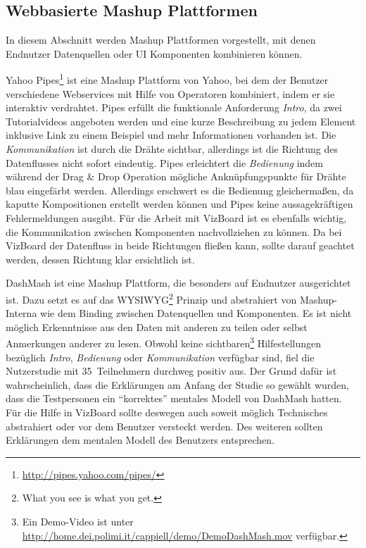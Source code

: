 \documentclass[
	headsepline,
	footsepline,
	fontsize=12pt,
	bibliography=totoc
]{scrbook}
\begin{document}
\subsection{Webbasierte Mashup Plattformen}
\label{section:standderforschung:verwandte_arbeiten:mashups}

In diesem Abschnitt werden Mashup Plattformen vorgestellt, mit denen Endnutzer Datenquellen oder UI Komponenten kombinieren können.


Yahoo Pipes\footnote{\url{http://pipes.yahoo.com/pipes/}} ist eine Mashup Plattform von Yahoo, bei dem der Benutzer verschiedene Webservices mit Hilfe von Operatoren kombiniert, indem er sie interaktiv verdrahtet.
Pipes erfüllt die funktionale Anforderung \emph{Intro}, da zwei Tutorialvideos angeboten werden und eine kurze Beschreibung zu jedem Element inklusive Link zu einem Beispiel und mehr Informationen vorhanden ist. Die \emph{Kommunikation} ist durch die Drähte sichtbar, allerdings ist die Richtung des Datenflusses nicht sofort eindeutig. Pipes erleichtert die \emph{Bedienung} indem während der Drag \& Drop Operation mögliche Anknüpfungspunkte für Drähte blau eingefärbt werden.
Allerdings erschwert es die Bedienung gleichermaßen, da kaputte Kompositionen erstellt werden können und Pipes keine aussagekräftigen Fehlermeldungen ausgibt.
Für die Arbeit mit VizBoard ist es ebenfalls wichtig, die Kommunikation zwischen Komponenten nachvollziehen zu können. Da bei VizBoard der Datenfluss in beide Richtungen fließen kann, sollte darauf geachtet werden, dessen Richtung klar ersichtlich ist.


DashMash \cite{Cappiello2011} ist eine Mashup Plattform, die besonders auf Endnutzer ausgerichtet ist. Dazu setzt es auf das WYSIWYG\footnote{What you see is what you get.} Prinzip und abstrahiert von Mashup-Interna wie dem Binding zwischen Datenquellen und Komponenten. Es ist nicht möglich Erkenntnisse aus den Daten mit anderen zu teilen oder selbst Anmerkungen anderer zu lesen. Obwohl keine sichtbaren\footnote{Ein Demo-Video ist unter \url{http://home.dei.polimi.it/cappiell/demo/DemoDashMash.mov} verfügbar.} Hilfestellungen bezüglich \emph{Intro}, \emph{Bedienung} oder \emph{Kommunikation} verfügbar sind, fiel die Nutzerstudie mit 35~Teilnehmern durchweg positiv aus. Der Grund dafür ist wahrscheinlich, dass die Erklärungen am Anfang der Studie so gewählt wurden, dass die Testpersonen ein \enquote{korrektes} mentales Modell von DashMash hatten. Für die Hilfe in VizBoard sollte deswegen auch soweit möglich Technisches abstrahiert oder vor dem Benutzer versteckt werden. Des weiteren sollten Erklärungen dem mentalen Modell des Benutzers entsprechen.
\end{document}
